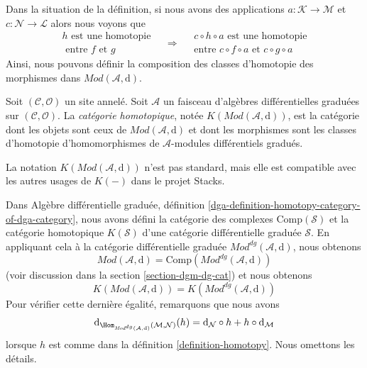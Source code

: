 \noindent
Dans la situation de la définition, si nous avons des applications $a : \mathcal{K} \to \mathcal{M}$ et $c : \mathcal{N} \to \mathcal{L}$ alors nous voyons que
$$
\begin{matrix}
h\text{ est une homotopie} \\
\text{ entre }f\text{ et } g
\end{matrix}
\quad
\Rightarrow
\quad
\begin{matrix}
c \circ h \circ a\text{ est une homotopie}\\
\text{entre }
c \circ f \circ a\text{ et } c\circ g \circ a
\end{matrix}
$$
Ainsi, nous pouvons définir la composition des classes d'homotopie des morphismes dans $\textit{Mod}(\mathcal{A}, \text{d})$.

\begin{definition}
\label{definition-complexes-notation}
Soit $(\mathcal{C}, \mathcal{O})$ un site annelé.
Soit $\mathcal{A}$ un faisceau d'algèbres différentielles graduées sur $(\mathcal{C}, \mathcal{O})$.
La {\it catégorie homotopique}, notée $K(\textit{Mod}(\mathcal{A}, \text{d}))$, est la catégorie dont les objets sont ceux de $\textit{Mod}(\mathcal{A}, \text{d})$ et dont les morphismes sont les classes d'homotopie d'homomorphismes de $\mathcal{A}$-modules différentiels gradués.
\end{definition}

\noindent
La notation $K(\textit{Mod}(\mathcal{A}, \text{d}))$ n'est pas standard, mais elle est compatible avec les autres usages de $K(-)$ dans le projet Stacks.

\medskip\noindent
Dans Algèbre différentielle graduée, définition \ref{dga-definition-homotopy-category-of-dga-category}, nous avons défini la catégorie des complexes $\text{Comp}(\mathcal{S})$ et la catégorie homotopique $K(\mathcal{S})$ d'une catégorie différentielle graduée $\mathcal{S}$.
En appliquant cela à la catégorie différentielle graduée $\textit{Mod}^{dg}(\mathcal{A}, \text{d})$, nous obtenons
$$
\textit{Mod}(\mathcal{A}, \text{d}) =
\text{Comp}(\textit{Mod}^{dg}(\mathcal{A}, \text{d}))
$$
(voir discussion dans la section \ref{section-dgm-dg-cat}) et nous obtenons
$$
K(\textit{Mod}(\mathcal{A}, \text{d})) =
K(\textit{Mod}^{dg}(\mathcal{A}, \text{d}))
$$
Pour vérifier cette dernière égalité, remarquons que nous avons
$$
\text{d}_{\Hom_{\textit{Mod}^{dg}(\mathcal{A}, \text{d})}
(\mathcal{M}, \mathcal{N})}(h) =
\text{d}_\mathcal{N} \circ h + h \circ \text{d}_\mathcal{M}
$$
lorsque $h$ est comme dans la définition \ref{definition-homotopy}.
Nous omettons les détails.

